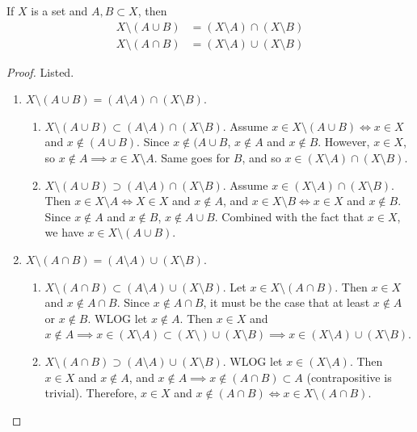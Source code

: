   \begin{theorem}
    If $X$ is a set and $A, B \subset X$, then 
    \begin{align}
      X \setminus (A \cup B) & = (X \setminus A) \cap (X \setminus B) \\
      X \setminus (A \cap B) & = (X \setminus A) \cup (X \setminus B)
    \end{align}
  \end{theorem}
  \begin{proof}
    Listed. 
    \begin{enumerate}
      \item $X \setminus (A \cup B) = (A \setminus A) \cap (X \setminus B)$.
        \begin{enumerate}
          \item $X \setminus (A \cup B) \subset (A \setminus A) \cap (X \setminus B)$. Assume $x \in X \setminus (A \cup B) \iff x \in X$ and $x \not\in (A \cup B)$. Since $x \not\in (A \cup B$, $x \not\in A$ and $x \not\in B$. However, $x \in X$, so $x \not\in A \implies x \in X \setminus A$. Same goes for $B$, and so $x \in (X \setminus A) \cap (X \setminus B)$. 

          \item $X \setminus (A \cup B) \supset (A \setminus A) \cap (X \setminus B)$. Assume $x \in (X \setminus A) \cap (X \setminus B)$. Then $x \in X \setminus A \iff X \in X$ and $x \not\in A$, and $x \in X \setminus B \iff x \in X$ and $x \not\in B$. Since $x \not\in A$ and $x \not\in B$, $x \not\in A \cup B$. Combined with the fact that $x \in X$, we have $x \in X \setminus (A \cup B)$. 
        \end{enumerate}

      \item $X \setminus (A \cap B) = (A \setminus A) \cup (X \setminus B)$.
        \begin{enumerate}
          \item $X \setminus (A \cap B) \subset (A \setminus A) \cup (X \setminus B)$. Let $x \in X \setminus (A \cap B)$. Then $x \in X$ and $x \not\in A \cap B$. Since $x \not\in A \cap B$, it must be the case that at least $x \not\in A$ or $x \not\in B$. WLOG let $x \not\in A$. Then $x \in X$ and $x \not\in A \implies x \in (X \setminus A) \subset (X \setminus) \cup (X \setminus B) \implies x \in (X \setminus A) \cup (X \setminus B)$. 

          \item $X \setminus (A \cap B) \supset (A \setminus A) \cup (X \setminus B)$. WLOG let $x \in (X \setminus A)$. Then $x \in X$ and $x \not\in A$, and $x \not\in A \implies x \not\in (A \cap B) \subset A$ (contrapositive is trivial). Therefore, $x \in X$ and $x \not\in (A \cap B) \iff  x \in X \setminus (A \cap B)$. 
        \end{enumerate}
    \end{enumerate}
  \end{proof} 

